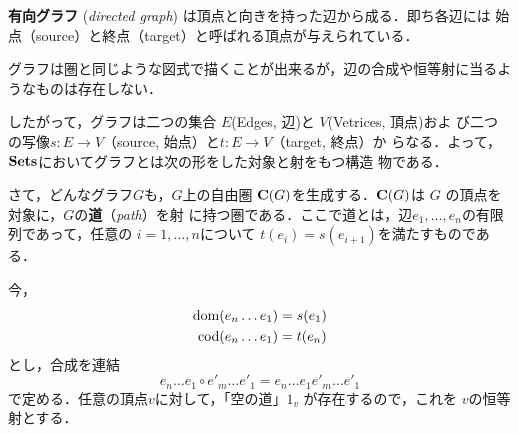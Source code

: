 {\bfseries 有向グラフ}
({\itshape directed graph})
は頂点と向きを持った辺から成る．即ち各辺には
始点（source）と終点（target）と呼ばれる頂点が与えられている．
\begin{center}
\end{center}
グラフは圏と同じような図式で描くことが出来るが，辺の合成や恒等射に当るよ
うなものは存在しない．

したがって，グラフは二つの集合 $E$(Edges, 辺)と $V$(Vetrices, 頂点)およ
び二つの写像$s: E \to V$（source, 始点）と$t: E \to V$（target, 終点）か
らなる．よって，$\mathbf{Sets}$においてグラフとは次の形をした対象と射をもつ構造
物である．
\begin{center}
\end{center}

さて，どんなグラフ$G$も，$G$上の自由圏 ${\bf C}(G)$を生成する．${\bf
C}(G)$は $G$ の頂点を対象に，$G$の{\bfseries 道}（{\itshape path}）を射
に持つ圏である．ここで道とは，辺$e_1,\ldots,e_n$の有限列であって，任意の
$i = 1,\ldots,n$について $t(e_i) = s(e_{i+1})$を満たすものである．
\begin{center}
\end{center}
今，
\begin{align*}
 \mathrm{dom}(e_n\ldots e_1) &= s(e_1)\\
 \mathrm{cod}(e_n\ldots e_1) &= t(e_n)
\end{align*}
とし，合成を連結
\[
 e_n \ldots e_1 \circ e'_m \ldots e'_1 = e_n \ldots e_1 e'_m \ldots e'_1
\]
で定める．任意の頂点$v$に対して，「空の道」$1_v$ が存在するので，これを
$v$の恒等射とする．

